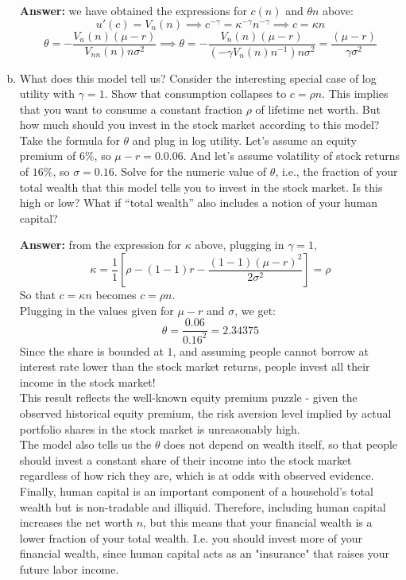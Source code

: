 \documentclass[11pt]{extarticle}
\theoremstyle{plain}
\theoremstyle{definition}
\begin{document}
\begin{enumerate}[(a)]
\textbf{Answer:} we have obtained the expressions for $c(n)$ and $\theta n$ above:
\[
u'(c) = V_n(n) \implies c^{-\gamma} = \kappa^{-\gamma} n^{-\gamma} \implies c = \kappa n
\]
\[
\theta = -\frac{V_n(n) (\mu - r)}{V_{nn}(n) n \sigma^2} \implies \theta = -\frac{V_n(n) (\mu - r)}{ \left( -\gamma V_n(n) n^{-1} \right) n \sigma^2 } = \frac{(\mu - r)}{\gamma \sigma^2}
\]



\item What does this model tell us? Consider the interesting special case of log utility with $\gamma = 1$. Show that consumption collapses to $c = \rho n$. This implies that you want to consume a constant fraction $\rho$ of lifetime net worth. But how much should you invest in the stock market according to this model? Take the formula for $\theta$ and plug in log utility. Let's assume an equity premium of $6\%$, so $\mu-r = 0.0.06$. And let's assume volatility of stock returns of $16\%$, so $\sigma = 0.16$. Solve for the numeric value of $\theta$, i.e., the fraction of your total wealth that this model tells you to invest in the stock market. Is this high or low? What if ``total wealth'' also includes a notion of your human capital?

\textbf{Answer:} from the expression for $\kappa$ above, plugging in $\gamma=1$,
\[
   \kappa = \frac{1}{1} \left[ \rho - (1 - 1) r - \frac{ (1 - 1) (\mu - r)^2 }{2 \sigma^2 } \right] = \rho
\]
So that $c=\kappa n$ becomes $c=\rho n$. \\
Plugging in the values given for $\mu - r$ and $\sigma$, we get:
$$\theta = \frac{0.06}{0.16^2}=2.34375$$
Since the share is bounded at $1$, and assuming people cannot borrow at interest rate lower than the stock market returns, people invest all their income in the stock market!\\
This result reflects the well-known equity premium puzzle - given the observed historical equity premium, the risk aversion level implied by actual portfolio shares in the stock market is unreasonably high. \\
The model also tells us the $\theta$ does not depend on wealth itself, so that people should invest a constant share of their income into the stock market regardless of how rich they are, which is at odds with observed evidence.\\
Finally, human capital is an important component of a household's total wealth but is non-tradable and illiquid. Therefore, including human capital increases the net worth \( n \), but this means that your financial wealth is a lower fraction of your total wealth. I.e. you should invest more of your financial wealth, since human capital acts as an "insurance" that raises your future labor income.

\end{enumerate}
\end{document}
